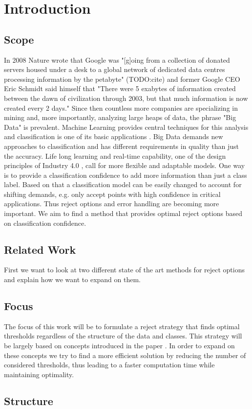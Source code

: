 %
\chapter{Introduction}
\label{sec:intro}

\section{Scope}
In 2008 Nature wrote that Google was "[g]oing from a collection of donated servers housed under a desk to a global network of dedicated data centres processing information by the petabyte" (TODO:cite) and former Google CEO Eric Schmidt said himself that "There were 5 exabytes of information created between the dawn of civilization through 2003, but that much information is now created every 2 days." Since then countless more companies are specializing in mining and, more importantly, analyzing large heaps of data, the phrase "Big Data" is prevalent. Machine Learning provides central techniques for this analysis and classification is one of its basic applications \cite[p. 5]{Alp:2010}. Big Data demands new approaches to classification and has different requirements in quality than just the accuracy. Life long learning \cite[p. 3]{Sut:2014} and real-time capability, one of the design principles of Industry 4.0 \cite[p. 12]{Her:2015}, call for more flexible and adaptable models. One way is to provide a classification confidence \cite{Del:2005} to add more information than just a class label. Based on that a classification model can be easily changed to account for shifting demands, e.g. only accept points with high confidence in critical applications. Thus reject options and error handling are becoming more important. We aim to find a method that provides optimal reject options based on classification confidence.

\section{Related Work}
First we want to look at two different state of the art methods for reject options and explain how we want to expand on them.

\cite{Ste:2000}

\cite{Cho:1970}

\section{Focus}
The focus of this work will be to formulate a reject strategy that finds optimal thresholds regardless of the  structure of the data and classes. This strategy will be largely based on concepts introduced in the paper \cite{Fis:2015}. In order to expand on these concepts we try to find a more efficient solution by reducing the number of considered thresholds, thus leading to a faster computation time while maintaining optimality.

\section{Structure}

